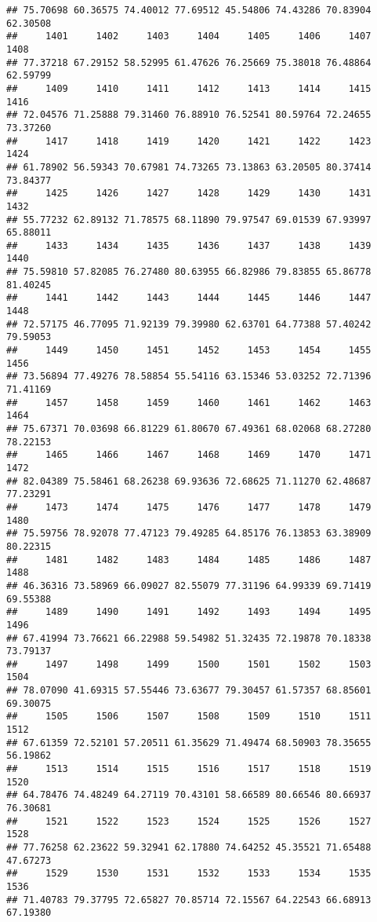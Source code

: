 \documentclass[
]{article}
\begin{document}
\begin{verbatim}
## 75.70698 60.36575 74.40012 77.69512 45.54806 74.43286 70.83904 62.30508 
##     1401     1402     1403     1404     1405     1406     1407     1408 
## 77.37218 67.29152 58.52995 61.47626 76.25669 75.38018 76.48864 62.59799 
##     1409     1410     1411     1412     1413     1414     1415     1416 
## 72.04576 71.25888 79.31460 76.88910 76.52541 80.59764 72.24655 73.37260 
##     1417     1418     1419     1420     1421     1422     1423     1424 
## 61.78902 56.59343 70.67981 74.73265 73.13863 63.20505 80.37414 73.84377 
##     1425     1426     1427     1428     1429     1430     1431     1432 
## 55.77232 62.89132 71.78575 68.11890 79.97547 69.01539 67.93997 65.88011 
##     1433     1434     1435     1436     1437     1438     1439     1440 
## 75.59810 57.82085 76.27480 80.63955 66.82986 79.83855 65.86778 81.40245 
##     1441     1442     1443     1444     1445     1446     1447     1448 
## 72.57175 46.77095 71.92139 79.39980 62.63701 64.77388 57.40242 79.59053 
##     1449     1450     1451     1452     1453     1454     1455     1456 
## 73.56894 77.49276 78.58854 55.54116 63.15346 53.03252 72.71396 71.41169 
##     1457     1458     1459     1460     1461     1462     1463     1464 
## 75.67371 70.03698 66.81229 61.80670 67.49361 68.02068 68.27280 78.22153 
##     1465     1466     1467     1468     1469     1470     1471     1472 
## 82.04389 75.58461 68.26238 69.93636 72.68625 71.11270 62.48687 77.23291 
##     1473     1474     1475     1476     1477     1478     1479     1480 
## 75.59756 78.92078 77.47123 79.49285 64.85176 76.13853 63.38909 80.22315 
##     1481     1482     1483     1484     1485     1486     1487     1488 
## 46.36316 73.58969 66.09027 82.55079 77.31196 64.99339 69.71419 69.55388 
##     1489     1490     1491     1492     1493     1494     1495     1496 
## 67.41994 73.76621 66.22988 59.54982 51.32435 72.19878 70.18338 73.79137 
##     1497     1498     1499     1500     1501     1502     1503     1504 
## 78.07090 41.69315 57.55446 73.63677 79.30457 61.57357 68.85601 69.30075 
##     1505     1506     1507     1508     1509     1510     1511     1512 
## 67.61359 72.52101 57.20511 61.35629 71.49474 68.50903 78.35655 56.19862 
##     1513     1514     1515     1516     1517     1518     1519     1520 
## 64.78476 74.48249 64.27119 70.43101 58.66589 80.66546 80.66937 76.30681 
##     1521     1522     1523     1524     1525     1526     1527     1528 
## 77.76258 62.23622 59.32941 62.17880 74.64252 45.35521 71.65488 47.67273 
##     1529     1530     1531     1532     1533     1534     1535     1536 
## 71.40783 79.37795 72.65827 70.85714 72.15567 64.22543 66.68913 67.19380 

\end{verbatim}
\end{document}
